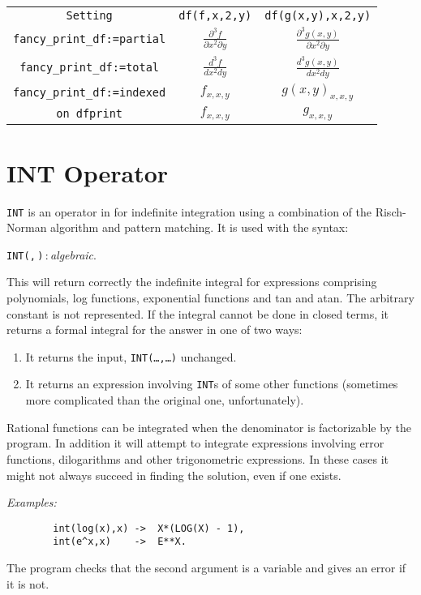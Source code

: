 \begin{tabular}{ccc}
  \texttt{Setting} & \texttt{df(f,x,2,y)} & \texttt{df(g(x,y),x,2,y)} \\
  \texttt{fancy\_print\_df:=partial} &
  \(\frac{\partial^3 f}{\partial x^2 \partial y}\) &
  \(\frac{\partial^3 g(x,y)}{\partial x^2 \partial y}\) \\
  \texttt{fancy\_print\_df:=total} & \(\frac{d^3 f}{d x^2 d y}\) &
  \(\frac{d^3 g(x,y)}{d x^2 d y}\) \\
  \texttt{fancy\_print\_df:=indexed} & \(f_{x,x,y}\) & \(g(x,y)_{x,x,y}\) \\
  \texttt{on dfprint} & \(f_{x,x,y}\) & \(g_{x,x,y}\)
\end{tabular}

\section{INT Operator}
\hypertarget{operator:INT}{}
\texttt{INT} is an operator in {\REDUCE} for indefinite
integration using a
combination of the Risch-Norman algorithm and pattern matching.  It is
used with the syntax:
\begin{syntax}
  \texttt{INT(}\texttt{,}\,\texttt{)}\,:\,\textit{algebraic}.
\end{syntax}
This will return correctly the indefinite integral for expressions comprising
polynomials, log functions, exponential functions and tan and atan. The
arbitrary constant is not represented. If the integral cannot be done in
closed terms, it returns a formal integral for the answer in one of two ways:
\begin{enumerate}
\item It returns the input, \texttt{INT(\ldots,\ldots)} unchanged.

\item It returns an expression involving \texttt{INT}s of some
      other functions (sometimes more complicated than
      the original one, unfortunately).
\end{enumerate}
Rational functions can be integrated when the denominator is factorizable
by the program. In addition it will attempt to integrate expressions
involving error functions, dilogarithms and other trigonometric
expressions. In these cases it might not always succeed in finding the
solution, even if one exists.

\textit{Examples:}
\begin{verbatim}
        int(log(x),x) ->  X*(LOG(X) - 1),
        int(e^x,x)    ->  E**X.
\end{verbatim}
The program checks that the second argument is a variable and gives an
error if it is not.

